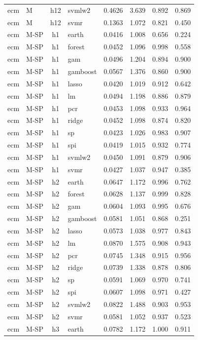 \begin{ThreePartTable}
\begin{longtable}[t]{llclcccc}
ecm & M & h12 & svmlw2 & 0.4626 & 3.639 & 0.892 & 0.869\\
ecm & M & h12 & svmr & 0.1363 & 1.072 & 0.821 & 0.450\\
\addlinespace
ecm & M-SP & h1 & earth & 0.0416 & 1.008 & 0.656 & 0.224\\
ecm & M-SP & h1 & forest & 0.0452 & 1.096 & 0.998 & 0.558\\
ecm & M-SP & h1 & gam & 0.0496 & 1.204 & 0.894 & 0.900\\
ecm & M-SP & h1 & gamboost & 0.0567 & 1.376 & 0.860 & 0.900\\
ecm & M-SP & h1 & lasso & 0.0420 & 1.019 & 0.912 & 0.642\\
ecm & M-SP & h1 & lm & 0.0494 & 1.198 & 0.886 & 0.879\\
ecm & M-SP & h1 & pcr & 0.0453 & 1.098 & 0.933 & 0.964\\
ecm & M-SP & h1 & ridge & 0.0452 & 1.098 & 0.874 & 0.820\\
ecm & M-SP & h1 & sp & 0.0423 & 1.026 & 0.983 & 0.907\\
ecm & M-SP & h1 & spi & 0.0419 & 1.015 & 0.932 & 0.774\\
ecm & M-SP & h1 & svmlw2 & 0.0450 & 1.091 & 0.879 & 0.906\\
ecm & M-SP & h1 & svmr & 0.0427 & 1.037 & 0.947 & 0.385\\
\addlinespace
ecm & M-SP & h2 & earth & 0.0647 & 1.172 & 0.996 & 0.762\\
ecm & M-SP & h2 & forest & 0.0628 & 1.137 & 0.999 & 0.828\\
ecm & M-SP & h2 & gam & 0.0604 & 1.093 & 0.995 & 0.676\\
ecm & M-SP & h2 & gamboost & 0.0581 & 1.051 & 0.868 & 0.251\\
ecm & M-SP & h2 & lasso & 0.0573 & 1.038 & 0.977 & 0.843\\
ecm & M-SP & h2 & lm & 0.0870 & 1.575 & 0.908 & 0.943\\
ecm & M-SP & h2 & pcr & 0.0745 & 1.348 & 0.915 & 0.956\\
ecm & M-SP & h2 & ridge & 0.0739 & 1.338 & 0.878 & 0.806\\
ecm & M-SP & h2 & sp & 0.0591 & 1.069 & 0.970 & 0.741\\
ecm & M-SP & h2 & spi & 0.0607 & 1.098 & 0.971 & 0.427\\
ecm & M-SP & h2 & svmlw2 & 0.0822 & 1.488 & 0.903 & 0.953\\
ecm & M-SP & h2 & svmr & 0.0581 & 1.052 & 0.937 & 0.523\\
\addlinespace
ecm & M-SP & h3 & earth & 0.0782 & 1.172 & 1.000 & 0.911\\

\end{longtable}
\end{ThreePartTable}
